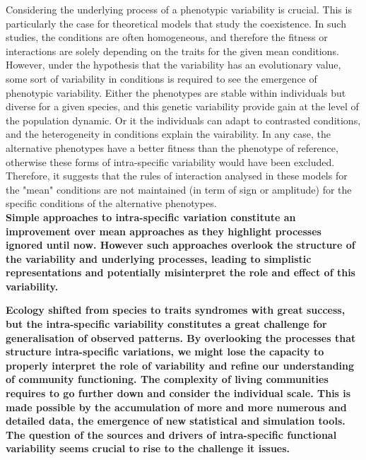 Considering the underlying process of a phenotypic variability is crucial. This is particularly the case for theoretical models that study the coexistence. In such studies, the conditions are often homogeneous, and therefore the fitness or interactions are solely depending on the traits for the given mean conditions. However, under the hypothesis that the variability has an evolutionary value, some sort of variability in conditions is required to see the emergence of phenotypic variability. Either the phenotypes are stable within individuals but diverse for a given species, and this genetic variability provide gain at the level of the population dynamic. Or it the individuals can adapt to contrasted conditions, and the heterogeneity in conditions explain the vairability. In any case, the alternative phenotypes have a better fitness than the phenotype of reference, otherwise these forms of intra-specific variability would have been excluded. Therefore, it suggests that the rules of interaction analysed in these models for the "mean" conditions are not maintained (in term of sign or amplitude) for the specific conditions of the alternative phenotypes. \\

%


\textbf{Simple approaches to intra-specific variation constitute an improvement over mean approaches as they highlight processes ignored until now. However such approaches overlook the structure of the variability and underlying processes, leading to simplistic representations and potentially misinterpret the role and effect of this variability.}


\textbf{%
Ecology shifted from species to traits syndromes with great success, but the intra-specific variability constitutes a great challenge for generalisation of observed patterns. By overlooking the processes that structure intra-specific variations, we might lose the capacity to properly interpret the role of variability and refine our understanding of community functioning. The complexity of living communities requires to go further down and consider the individual scale. This is made possible by the accumulation of more and more numerous and detailed data, the emergence of new statistical and simulation tools. The question of the sources and drivers of intra-specific functional variability seems crucial to rise to the challenge it issues.}



